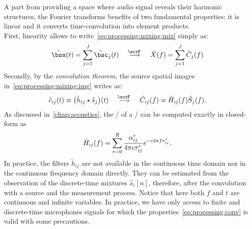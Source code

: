 A part from providing a space where audio signal reveals their harmonic structures, the Fourier transforms benefits of two fundamental properties:
it is linear and it converts time-convolution into element products.
\\First, linearity allows to write~\cref{eq:processing:mixing:mix} simply as:
\begin{equation}\label{eq:processing:ft:mix}
    \tilde{\mics}( t) = \sum_{\idxSrc=1}^{\numSrcs} \tilde{\imgs}_\idxSrc( t)
    \mathspace\overset{\fourierTrans{}}{\kto}\mathspace
    \tilde{X}( f) = \sum_{\idxSrc=1}^{\numSrcs} \tilde{C}_\idxSrc( f)
\end{equation}
Secondly, by the \textit{convolution theorem}, the source spatial images in~\cref{eq:processing:mixing:img} writes as:
\begin{equation}\label{eq:processing:conv}
    \tilde{\img}_{\idxMic\idxSrc}( t) =  \kparen{\tilde{\rir}_{\idxMic\idxSrc} \convCont \tilde{\src}_\idxSrc} ( t)
    \mathspace\overset{\fourierTrans{}}{\kto}\mathspace
    \tilde{C}_{\idxMic\idxSrc}( f) =  \tilde{H}_{\idxMic\idxSrc}( f) \tilde{S}_\idxSrc( f)
    .
\end{equation}
As discussed in~\cref{chap:acoustics}, the \FT/ of a \RIR/ can be computed exactly in closed-form as
\begin{equation}\label{eq:processing:rir:ft}
    \tilde{H}_{ij}( f) = \sum_{r=0}^{R}
    \frac{\alpha_{ij}^r}{4 \pi c \tau_{ij}^r}
    {e}^{- {i} 2 \pi f \tau_{ij}^r}
    .
\end{equation}
In practice, the filters $\tilde{h}_{ij}$ are not available in the continuous time domain nor in the continuous frequency domain directly.
They can be estimated from the observation of the discrete-time mixtures $\hat{x}_i[n]$, therefore,
after the convolution with a source and the measurement process.
Notice that here both $f$ and $t$ are continuous and infinite variables.
In practice, we have only access to finite and discrete-time microphones signals for which the properties~\eqref{eq:processing:conv} is valid with some precautions.

